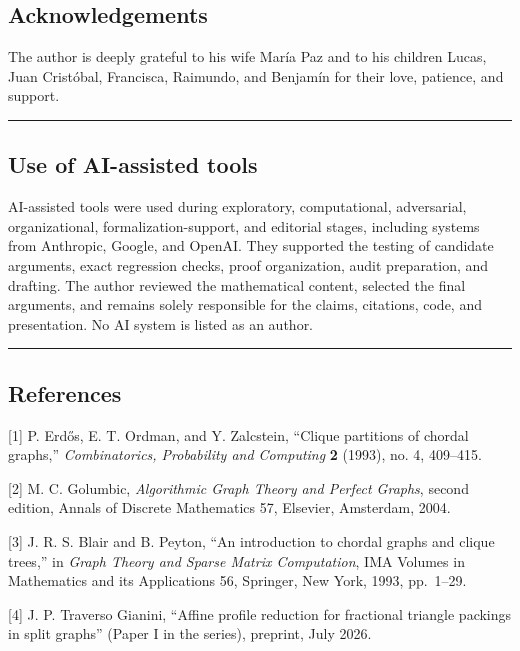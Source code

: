 \documentclass[
  american,
  11pt,
  a4paper,
]{article}
\begin{document}
\subsection{Acknowledgements}\label{acknowledgements}

The author is deeply grateful to his wife María Paz and to his children Lucas, Juan Cristóbal, Francisca, Raimundo, and Benjamín for their love, patience, and support.

\begin{center}\rule{0.5\linewidth}{0.5pt}\end{center}

\subsection{Use of AI-assisted tools}\label{use-of-ai-assisted-tools}

AI-assisted tools were used during exploratory, computational, adversarial, organizational, formalization-support, and editorial stages, including systems from Anthropic, Google, and OpenAI. They supported the testing of candidate arguments, exact regression checks, proof organization, audit preparation, and drafting. The author reviewed the mathematical content, selected the final arguments, and remains solely responsible for the claims, citations, code, and presentation. No AI system is listed as an author.

\begin{center}\rule{0.5\linewidth}{0.5pt}\end{center}

\subsection{References}\label{references}

{[}1{]} P. Erdős, E. T. Ordman, and Y. Zalcstein, ``Clique partitions of chordal graphs,'' \emph{Combinatorics, Probability and Computing} \textbf{2} (1993), no. 4, 409--415.

{[}2{]} M. C. Golumbic, \emph{Algorithmic Graph Theory and Perfect Graphs}, second edition, Annals of Discrete Mathematics 57, Elsevier, Amsterdam, 2004.

{[}3{]} J. R. S. Blair and B. Peyton, ``An introduction to chordal graphs and clique trees,'' in \emph{Graph Theory and Sparse Matrix Computation}, IMA Volumes in Mathematics and its Applications 56, Springer, New York, 1993, pp.~1--29.

{[}4{]} J. P. Traverso Gianini, ``Affine profile reduction for fractional triangle packings in split graphs'' (Paper I in the series), preprint, July 2026.
\end{document}
